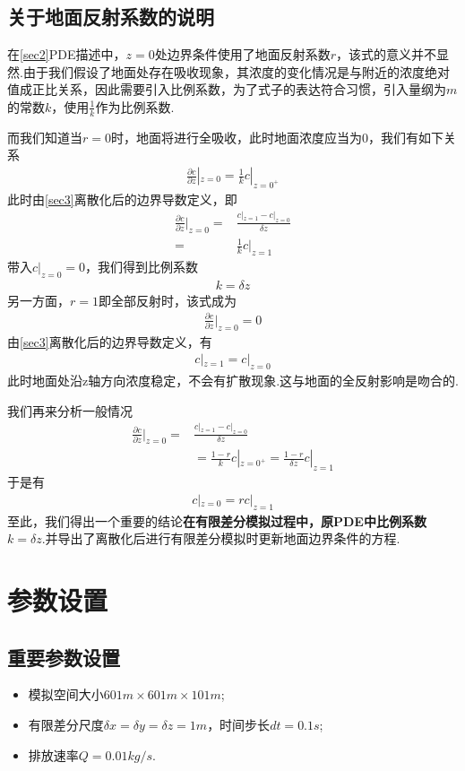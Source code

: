 \documentclass{article}
\begin{document}
	\subsection{关于地面反射系数的说明}\label{sec4}
	在\cref{sec2}PDE描述中，$z=0$处边界条件使用了地面反射系数$r$，该式的意义并不显然.由于我们假设了地面处存在吸收现象，其浓度的变化情况是与附近的浓度绝对值成正比关系，因此需要引入比例系数，为了式子的表达符合习惯，引入量纲为$m$的常数$k$，使用$\frac{1}{k}$作为比例系数.
	
	而我们知道当$r=0$时，地面将进行全吸收，此时地面浓度应当为0，我们有如下关系
	\begin{align*}
		\frac{\partial c}{\partial z}|_{z=0} = \frac{1}{k}c|_{z=0^+}
	\end{align*}
	此时由\cref{sec3}离散化后的边界导数定义，即
	\begin{align*}
		\frac{\partial c}{\partial z}|_{z=0} =& \frac{c|_{z=1}-c|_{z=0}}{\delta z} \\
		=& \frac{1}{k}c|_{z=1}
	\end{align*}
	带入$c|_{z=0}=0$，我们得到比例系数
	\begin{align*}
		k=\delta z
	\end{align*}
	另一方面，$r=1$即全部反射时，该式成为
	\begin{align*}
		\frac{\partial c}{\partial z}|_{z=0} = 0
	\end{align*}
	由\cref{sec3}离散化后的边界导数定义，有
	\begin{align*}
		c|_{z=1}=c|_{z=0}
	\end{align*}
	此时地面处沿z轴方向浓度稳定，不会有扩散现象.这与地面的全反射影响是吻合的.
	
	我们再来分析一般情况
	\begin{align*}
		\frac{\partial c}{\partial z}|_{z=0} =& \frac{c|_{z=1}-c|_{z=0}}{\delta z}\\
		& = \frac{1-r}{k} c|_{z=0^+} = \frac{1-r}{\delta z} c|_{z=1}
	\end{align*}
	于是有
	\begin{align*}
		c|_{z=0} = rc|_{z=1}
	\end{align*}
	至此，我们得出一个重要的结论\textbf{在有限差分模拟过程中，原PDE中比例系数$k=\delta z$}.并导出了离散化后进行有限差分模拟时更新地面边界条件的方程.

	\section{参数设置}\label{sec5}
	\subsection{重要参数设置}
	\begin{itemize}
		\item 模拟空间大小$601m\times601m\times101m$;
		\item 有限差分尺度$\delta x=\delta y=\delta z = 1m$，时间步长$dt=0.1s$;
		\item 排放速率$Q=0.01 kg/s$.
	\end{itemize}
\end{document}
